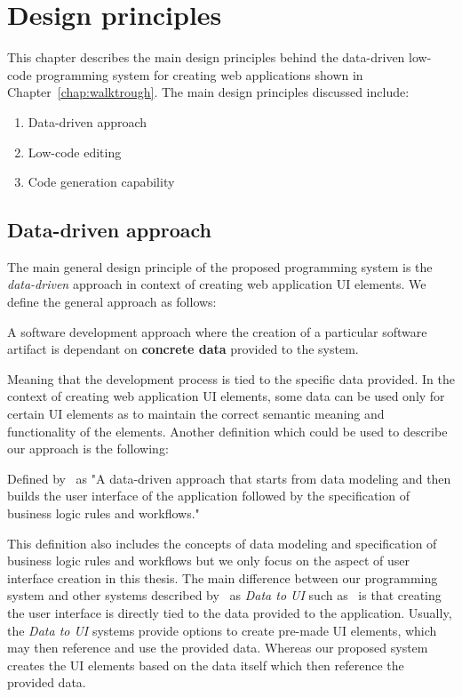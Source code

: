 \chapter{Design principles}
\label{chap:design}

This chapter describes the main design principles behind the data-driven low-code programming system for creating web applications shown in Chapter~\ref{chap:walktrough}.
The main design principles discussed include:
\begin{enumerate}
	\item Data-driven approach
	\item Low-code editing
	\item Code generation capability
\end{enumerate}

\section{Data-driven approach}

The main general design principle of the proposed programming system is the \emph{data-driven} approach in context of creating web application UI elements.
We define the general approach as follows:
\begin{defn}
	A software development approach where the creation of a particular software artifact is dependant on \textbf{concrete data} provided to the system.
\end{defn}

Meaning that the development process is tied to the specific data provided.
In the context of creating web application UI elements, some data can be used only for certain UI elements as to maintain the correct semantic meaning and functionality of the elements.
Another definition which could be used to describe our approach is the following:

\begin{defn}[Data to UI]
	Defined by~\citet{Sahay_Indamutsa_Di} as "A data-driven approach that starts from data modeling and then builds the user interface of the application followed by the specification of business logic rules and workflows."
\end{defn}

This definition also includes the concepts of data modeling and specification of business logic rules and workflows but we only focus on the aspect of user interface creation in this thesis.
The main difference between our programming system and other systems described by~\citet{Sahay_Indamutsa_Di} as \emph{Data to UI} such as~\citet{mendix} is that creating the user interface is directly tied to the data provided to the application.
Usually, the \emph{Data to UI} systems provide options to create pre-made UI elements, which may then reference and use the provided data.
Whereas our proposed system creates the UI elements based on the data itself which then reference the provided data.

